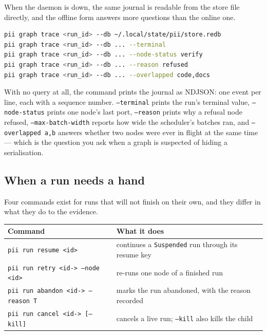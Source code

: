 When the daemon is down, the same journal is readable from the store file directly, and
the offline form answers more questions than the online one.

\begin{lstlisting}[language=bash]
pii graph trace <run_id> --db ~/.local/state/pii/store.redb
pii graph trace <run_id> --db ... --terminal
pii graph trace <run_id> --db ... --node-status verify
pii graph trace <run_id> --db ... --reason refused
pii graph trace <run_id> --db ... --overlapped code,docs
\end{lstlisting}

With no query at all, the command prints the journal as NDJSON: one event per line, each
with a sequence number.
\texttt{--terminal} prints the run's terminal value, \texttt{--node-status} prints one
node's last port, \texttt{--reason} prints why a refusal node refused,
\texttt{--max-batch-width} reports how wide the scheduler's batches ran, and
\texttt{--overlapped a,b} answers whether two nodes were ever in flight at the same time ---
which is the question you ask when a graph is suspected of hiding a serialisation.

\subsection*{When a run needs a hand}

Four commands exist for runs that will not finish on their own, and they differ in what
they do to the evidence.

\begin{center}
\begin{tabular}{@{}p{}p{}@{}}
	\toprule
	\textbf{Command} & \textbf{What it does} \\
	\midrule
        \texttt{pii run resume \textless{}id\textgreater{}} & continues a \texttt{Suspended} run
through its resume
	key \\
        \texttt{pii run retry \textless{}id-> --node \textless{}id\textgreater{}} &
re-runs one node of a finished run \\
        \texttt{pii run abandon \textless{}id-> --reason T} & marks the run
abandoned, with the reason
	recorded \\
        \texttt{pii run cancel \textless{}id-> [--kill]} & cancels a live run;
\texttt{--kill} also kills
	the child \\
	\bottomrule
\end{tabular}
\end{center}

